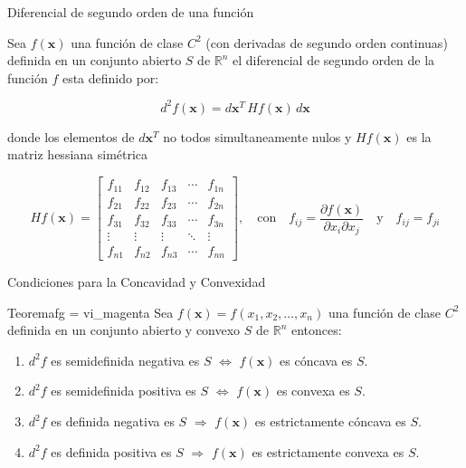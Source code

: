\documentclass[10pt,aspectratio=169]{beamer}  %
\begin{document}
\begin{frame}{Diferencial de segundo orden de una función}
	
Sea $f(\mathbf{x})$ una función de clase $C^2$ (con derivadas de segundo orden continuas) definida en un conjunto 
abierto $S$ de  $\mathbb{R}^n$ el diferencial de segundo orden de la función $f$ esta definido por:

	\[ 
		d^2f(\mathbf{x}) = d\mathbf{x}^T \, Hf(\mathbf{x})\, d\mathbf{x}     
	\]

donde los elementos de $d\mathbf{x}^T$ no todos simultaneamente nulos y $Hf(\mathbf{x})$ es la matriz hessiana simétrica

	\[ 
		Hf(\mathbf{x}) = \begin{bmatrix}
			f_{11} & f_{12} & f_{13} & \cdots & f_{1n} \\
			f_{21} & f_{22} & f_{23} & \cdots & f_{2n} \\
			f_{31} & f_{32} & f_{33} & \cdots & f_{3n} \\
			\vdots & \vdots & \vdots & \ddots & \vdots \\
			f_{n1} & f_{n2} & f_{n3} & \cdots & f_{nn}
		\end{bmatrix}, \quad \text{con} \quad f_{ij} = \frac{\partial f(\mathbf{x})}{\partial x_i \partial x_j} 
		\quad \text{y} \quad f_{ij} = f_{ji}
	\]

\end{frame}

\begin{frame}{Condiciones para la Concavidad y Convexidad}

	\begin{varblock}{Teorema}{fg = vi_magenta}
		Sea $f(\mathbf{x}) = f(x_1, x_2, \dots, x_n)$ una función de clase $C^2$ definida en un conjunto abierto
		y convexo $S$ de  $\mathbb{R}^n$ entonces:

		\begin{enumerate}[label=(\alph*)]
			\item $d^2f$ es semidefinida negativa es $S$  $\Longleftrightarrow$  $f(\mathbf{x})$ es cóncava es $S$.
			\item $d^2f$ es semidefinida positiva es $S$  $\Longleftrightarrow$  $f(\mathbf{x})$ es convexa es $S$.
			\item $d^2f$ es definida negativa es $S$  $\Longrightarrow$  $f(\mathbf{x})$ es estrictamente cóncava es $S$.
			\item $d^2f$ es definida positiva es $S$  $\Longrightarrow$  $f(\mathbf{x})$ es estrictamente convexa es $S$.
		\end{enumerate}

	\end{varblock}

\end{frame}
\end{document}
